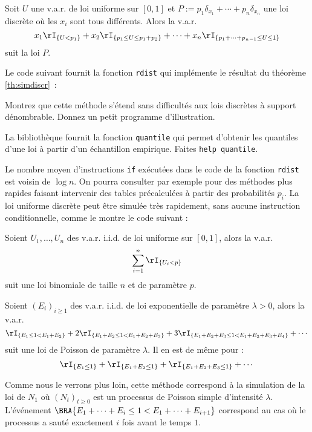 \begin{thm}\label{th:simdiscr}
  Soit $U$ une v.a.r. de loi uniforme sur $[0,1]$ et $P:=p_1\delta_{x_1}+\cdots+p_n
  \delta_{x_n}$ une loi discrète où les $x_i$ sont tous différents. Alors la v.a.r.
  $$
  x_1 \rI_{\{U < p_1\}} 
  + x_2 \rI_{\{p_1\leq U \leq p_1+p_2\}} 
  + \cdots + x_n \rI_{\{p_1 + \cdots + p_{n-1} \leq U \leq 1\}}
  $$
  suit la loi $P$.
\end{thm}
Le code \ML{} suivant fournit la fonction \texttt{rdist} qui
implémente le résultat du théorème \ref{th:simdiscr}~:
%
%
\begin{exo}
  Montrez que cette méthode s'étend sans difficultés aux lois discrètes à
  support dénombrable. Donnez un petit programme d'illustration.
\end{exo}
La bibliothèque \SB{} fournit la fonction \texttt{quantile} qui permet
d'obtenir les quantiles d'une loi à partir d'un échantillon empirique. Faites
\texttt{help quantile}.

Le nombre moyen d'instructions \texttt{if} exécutées dans le code de la
fonction \texttt{rdist} est voisin de $\log n$. On pourra consulter par
exemple \cite{knuth-taocp-2-3} pour des méthodes plus rapides faisant
intervenir des tables précalculées à partir des probabilités $p_i$. La loi
uniforme discrète peut être simulée très rapidement, sans aucune instruction
conditionnelle, comme le montre le code suivant :
%
%

\begin{thm}
  Soient $U_1,\ldots,U_n$ des v.a.r. i.i.d. de loi uniforme sur $[0,1]$,
  alors la v.a.r. 
  $$
  \sum_{i=1}^n \rI_{\{U_i < p\}}
  $$
  suit une loi binomiale de taille $n$ et de paramètre $p$.
\end{thm}

\begin{thm}
  Soient $(E_i)_{i\geq 1}$ des v.a.r. i.i.d. de loi exponentielle de paramètre
  $\lambda >0$, alors la v.a.r.
  $$
  \rI_{\{E_1\leq 1 < E_1+E_2\}} 
  + 2 \rI_{\{E_1+E_2\leq 1 < E_1+E_2+E_3\}}
  + 3 \rI_{\{E_1+E_2+E_3\leq 1 < E_1+E_2+E_3+E_4\}}
  + \cdots
  $$
  suit une loi de Poisson de paramètre $\lambda$. Il en est de même pour :
  $$
  \rI_{\{E_1\leq 1\}} 
  + \rI_{\{E_1+E_2\leq 1\}}
  + \rI_{\{E_1+E_2+E_3\leq 1\}}
  + \cdots
  $$
\end{thm}
Comme nous le verrons plus loin, cette méthode correspond à la simulation de
la loi de $N_1$ où $(N_t)_{t\geq 0}$ est un processus de Poisson simple
d'intensité $\lambda$. L'événement $\BRA{E_1+\cdots+E_i \leq 1 < E_1+\cdots+E_{i+1}}$ correspond
au cas où le processus a sauté exactement $i$ fois avant le temps $1$.

